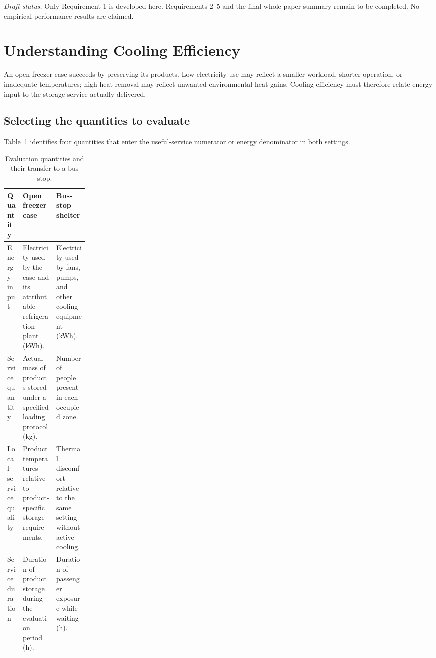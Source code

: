\documentclass[12pt]{article}
\begin{document}
\medskip
\noindent\textit{Draft status.} Only Requirement 1 is developed here. Requirements 2--5 and the final whole-paper summary remain to be completed. No empirical performance results are claimed.

\clearpage
\pagestyle{fancy}
\tableofcontents
\clearpage

\section{Understanding Cooling Efficiency}
\label{sec:understand}

An open freezer case succeeds by preserving its products. Low electricity use may reflect a smaller workload, shorter operation, or inadequate temperatures; high heat removal may reflect unwanted environmental heat gains. Cooling efficiency must therefore relate energy input to the storage service actually delivered.

\subsection{Selecting the quantities to evaluate}

Table~\ref{tab:service} identifies four quantities that enter the useful-service numerator or energy denominator in both settings.

\begin{table}[!ht]
\centering
\caption{Evaluation quantities and their transfer to a bus stop.}
\label{tab:service}
\small
\renewcommand{\arraystretch}{1.18}
\begin{tabularx}{\linewidth}{@{}>{\raggedright\arraybackslash}p{0.19\linewidth}
>{\raggedright\arraybackslash}X >{\raggedright\arraybackslash}X@{}}
\toprule
Quantity & Open freezer case & Bus-stop shelter\\
\midrule
Energy input & Electricity used by the case and its attributable refrigeration plant (kWh). & Electricity used by fans, pumps, and other cooling equipment (kWh).\\
Service quantity & Actual mass of products stored under a specified loading protocol (kg). & Number of people present in each occupied zone.\\
Local service quality & Product temperatures relative to product-specific storage requirements. & Thermal discomfort relative to the same setting without active cooling.\\
Service duration & Duration of product storage during the evaluation period (h). & Duration of passenger exposure while waiting (h).\\
\bottomrule
\end{tabularx}
\end{table}
\end{document}
